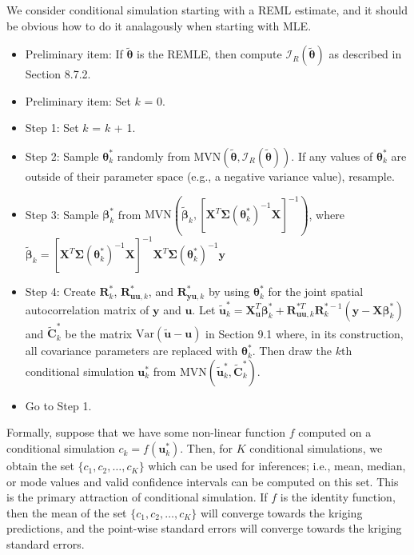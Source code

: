 \documentclass[12pt, titlepage]{article}
\begin{document}
We consider conditional simulation starting with a REML estimate, and it should be obvious how to do it analagously when starting with MLE.
\begin{itemize}
	\item Preliminary item: If $\tilde{\boldsymbol{\theta}}$ is the REMLE, then compute $\mathcal{I}_{R}(\tilde{\boldsymbol{\theta}})$ as described in Section 8.7.2.
	\item Preliminary item: Set $k$ = 0.
	\item Step 1: Set $k$ = $k$ + 1.
	\item Step 2: Sample $\boldsymbol{\theta}^{*}_{k}$ randomly from $\textrm{MVN}(\tilde{\boldsymbol{\theta}}, \mathcal{I}_{R}(\tilde{\boldsymbol{\theta}}))$.  If any values of $\boldsymbol{\theta}^{*}_{k}$ are outside of their parameter space (e.g., a negative variance value), resample.
	\item Step 3: Sample $\boldsymbol{\beta}^{*}_{k}$ from $\textrm{MVN}(\tilde{\boldsymbol{\beta}}_{k}, [\mathbf{X}^{T}\boldsymbol{\Sigma}(\boldsymbol{\theta}^{*}_{k})^{-1}\mathbf{X}]^{-1})$, where \\ 
	$\tilde{\boldsymbol{\beta}}_{k} = [\mathbf{X}^{T}\boldsymbol{\Sigma}(\boldsymbol{\theta}^{*}_{k})^{-1}\mathbf{X}]^{-1}\mathbf{X}^{T}\boldsymbol{\Sigma}(\boldsymbol{\theta}^{*}_{k})^{-1}\mathbf{y}$
	\item Step 4: Create $\mathbf{R}^{*}_{k}$, $\mathbf{R}^{*}_{\mathbf{uu},k}$, and $\mathbf{R}^{*}_{\mathbf{yu},k}$ by using $\boldsymbol{\theta}^{*}_{k}$ for the joint spatial autocorrelation matrix of $\mathbf{y}$ and $\mathbf{u}$.  Let $\tilde{\mathbf{u}}_{k}^{*} = \mathbf{X}_{\mathbf{u}}^{T}\boldsymbol{\beta}^{*}_{k} + \mathbf{R}^{*T}_{\mathbf{uu},k}\mathbf{R}^{*-1}_{k}(\mathbf{y} - \mathbf{X}\boldsymbol{\beta}^{*}_{k})$ and $\tilde{\mathbf{C}}^{*}_{k}$ be the matrix $\textrm{Var}(\tilde{\mathbf{u}} - \mathbf{u})$ in Section 9.1 where, in its construction, all covariance parameters are replaced with ${\boldsymbol{\theta}}^{*}_{k}$.  Then draw the $k$th conditional simulation $\mathbf{u}^{*}_{k}$ from $\textrm{MVN}(\tilde{\mathbf{u}}_{k}^{*},\tilde{\mathbf{C}}^{*}_{k})$.
	\item Go to Step 1.
\end{itemize}
	
	Formally, suppose that we have some non-linear function $f$ computed on a conditional simulation $c_{k} = f(\mathbf{u}^{*}_{k})$.  Then, for $K$ conditional simulations, we obtain the set $\{c_{1}, c_{2},\ldots,c_{K}\}$ which can be used for inferences; i.e., mean, median, or mode values and valid confidence intervals can be computed on this set.  This is the primary attraction of conditional simulation.  If $f$ is the identity function, then the mean of the set $\{c_{1}, c_{2},\ldots,c_{K}\}$ will converge towards the kriging predictions, and the point-wise standard errors will converge towards the kriging standard errors. 
\end{document}
